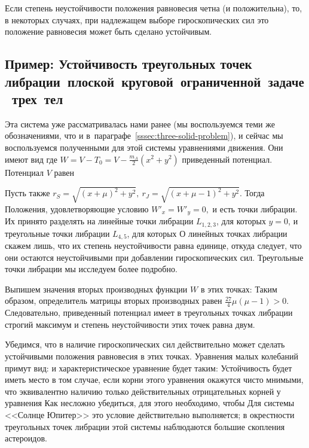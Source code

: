 \documentclass[a4paper,12pt]{article}
\begin{document}
\begin{note}
Если степень неустойчивости положения равновесия четна (и положительна), то, в некоторых случаях,
при надлежащем выборе гироскопических сил это положение равновесия может быть сделано устойчивым.
\end{note}

\subsection{Пример: Устойчивость треугольных точек либрации~плоской~круговой~ограниченной~задаче~трех~тел}

Эта система уже рассматривалась нами ранее (мы воспользуемся теми же обозначениями,
что и в~параграфе~\ref{sssec:three-solid-problem}),
и сейчас мы воспользуемся полученными для этой системы уравнениями движения. Они имеют вид
где $W=V-T_0=V-\frac{m_A}{2}(x^2+y^2)$ приведенный потенциал. Потенциал $V$ равен

Пусть также $r_S=\sqrt{(x+\mu)^2+y^2},\ r_J=\sqrt{(x+\mu-1)^2+y^2}$. Тогда
 Положения, удовлетворяющие
условию $W'_x=W'_y=0,$ и есть точки либрации. Их принято разделять на линейные точки либрации
$L_{1,2,3}$, для которых $y=0$, и треугольные точки либрации $L_{4,5}$, для которых
 О линейных точках либрации скажем лишь,
что их степень неустойчивости равна единице, откуда следует, что они остаются неустойчивыми при
добавлении гироскопических сил. Треугольные точки либрации мы исследуем более подробно.

Выпишем значения вторых производных функции $W$ в этих точках:
Таким образом, определитель
матрицы вторых производных равен $\frac{27}{4}\mu(\mu-1)>0$. Следовательно, приведенный потенциал
имеет в треугольных точках либрации строгий максимум и степень неустойчивости этих точек равна
двум.

Убедимся, что в наличие гироскопических сил действительно может сделать устойчивыми положения
равновесия в этих точках. Уравнения малых колебаний примут вид:
и характеристическое уравнение будет таким:
Устойчивость будет иметь место в том случае, если корни этого уравнения окажутся чисто мнимыми, что
эквивалентно наличию только действительных отрицательных корней у уравнения
 Как несложно убедиться, для этого необходимо, чтобы
 Для системы <<Солнце Юпитер>> это условие действительно выполняется; в
окрестности треугольных точек либрации этой системы наблюдаются большие скопления астероидов.
\end{document}
